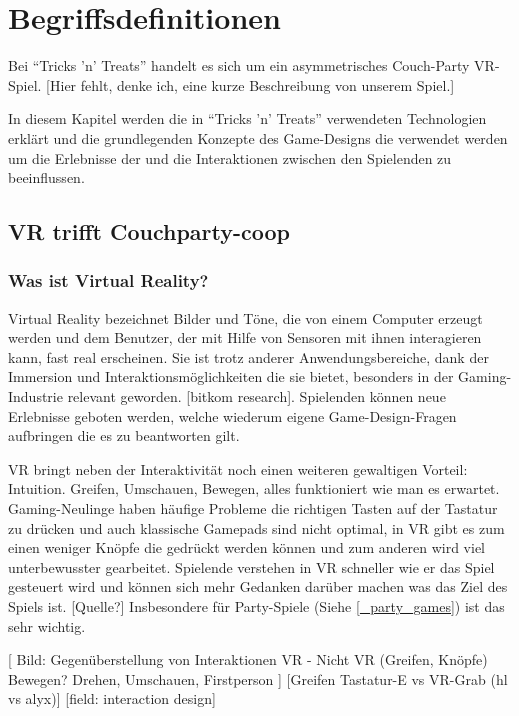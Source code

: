 \chapter{Begriffsdefinitionen}

Bei "`Tricks 'n' Treats"' handelt es sich um ein asymmetrisches Couch-Party VR-Spiel. [Hier fehlt, denke ich, eine kurze Beschreibung von unserem Spiel.]

In diesem Kapitel werden die in "`Tricks 'n' Treats"' verwendeten Technologien erklärt und die grundlegenden Konzepte des Game-Designs die verwendet werden um die  Erlebnisse der und die Interaktionen zwischen den Spielenden zu beeinflussen.

\section{VR trifft Couchparty-coop}

\subsection{Was ist Virtual Reality?}

Virtual Reality bezeichnet Bilder und Töne, die von einem Computer erzeugt werden und dem Benutzer, der mit Hilfe von Sensoren mit ihnen interagieren kann, fast real erscheinen.\cite{_oxford_dict} Sie ist trotz anderer Anwendungsbereiche, dank der Immersion und Interaktionsmöglichkeiten die sie bietet, besonders in der Gaming-Industrie relevant geworden. [bitkom research]. Spielenden können neue Erlebnisse geboten werden, welche wiederum eigene  Game-Design-Fragen aufbringen die es zu beantworten gilt.

VR bringt neben der Interaktivität noch einen weiteren gewaltigen Vorteil: Intuition. Greifen, Umschauen, Bewegen, alles funktioniert wie man es erwartet. Gaming-Neulinge haben häufige Probleme die richtigen Tasten auf der Tastatur zu drücken und auch klassische Gamepads sind nicht optimal, in VR gibt es zum einen weniger Knöpfe die gedrückt werden können und zum anderen wird viel unterbewusster gearbeitet. Spielende verstehen in VR schneller wie er das Spiel gesteuert wird und können sich mehr Gedanken darüber machen was das Ziel des Spiels ist. [Quelle?] Insbesondere für Party-Spiele (Siehe \ref{_party_games}) ist das sehr wichtig.

[
Bild: 
	Gegenüberstellung von Interaktionen VR - Nicht VR (Greifen, Knöpfe)
	Bewegen? Drehen, Umschauen, Firstperson
]
[Greifen Tastatur-E vs VR-Grab (hl vs alyx)]
[field: interaction design]

